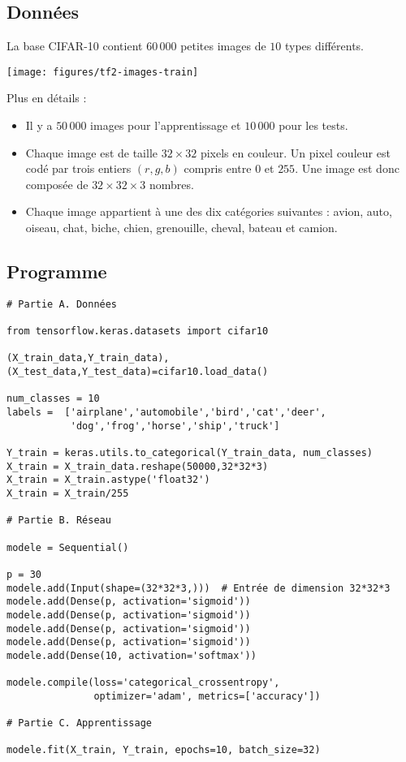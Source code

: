 \documentclass[11pt,class=report,crop=false]{standalone}
\begin{document}
\subsection{Données}

La base CIFAR-10 contient $60\,000$ petites images de $10$ types différents.
\begin{center}
\texttt{[image: figures/tf2-images-train]}
\end{center}

Plus en détails :
\begin{itemize}
  \item  Il y a $50\,000$ images pour l'apprentissage et $10\,000$ pour les tests.
  \item Chaque image est de taille $32\times 32$ pixels en couleur. 
  Un pixel couleur est codé par trois entiers $(r,g,b)$ compris entre $0$ et $255$.
  Une image est donc composée de $32\times32\times3$ nombres.
  
  \item Chaque image appartient à une des dix catégories suivantes : avion, auto, oiseau, chat, biche, chien, grenouille, cheval, bateau et camion.
\end{itemize}


\subsection{Programme}

\begin{lstlisting}
# Partie A. Données

from tensorflow.keras.datasets import cifar10

(X_train_data,Y_train_data),(X_test_data,Y_test_data)=cifar10.load_data()

num_classes = 10
labels =  ['airplane','automobile','bird','cat','deer',
           'dog','frog','horse','ship','truck']

Y_train = keras.utils.to_categorical(Y_train_data, num_classes)
X_train = X_train_data.reshape(50000,32*32*3)
X_train = X_train.astype('float32')
X_train = X_train/255

# Partie B. Réseau 

modele = Sequential()

p = 30
modele.add(Input(shape=(32*32*3,)))  # Entrée de dimension 32*32*3
modele.add(Dense(p, activation='sigmoid'))
modele.add(Dense(p, activation='sigmoid'))
modele.add(Dense(p, activation='sigmoid'))
modele.add(Dense(p, activation='sigmoid'))
modele.add(Dense(10, activation='softmax'))

modele.compile(loss='categorical_crossentropy', 
               optimizer='adam', metrics=['accuracy'])

# Partie C. Apprentissage

modele.fit(X_train, Y_train, epochs=10, batch_size=32)
\end{lstlisting}
\end{document}
